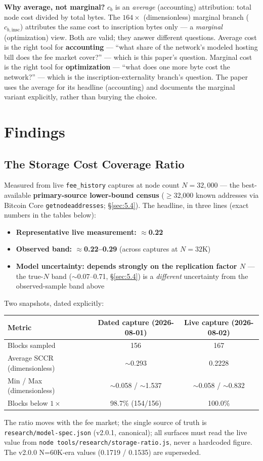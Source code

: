 \documentclass[11pt]{article}
\begin{document}
\textbf{Why average, not marginal?} $c_b$ is an \emph{average} (accounting) attribution: total node cost divided by total bytes. The $164\times$ (dimensionless) marginal branch ($c_{b,\mathrm{insc}}$) attributes the same cost to inscription bytes only --- a \emph{marginal} (optimization) view. Both are valid; they answer different questions. Average cost is the right tool for \textbf{accounting} --- ``what share of the network's modeled hosting bill does the fee market cover?'' --- which is this paper's question. Marginal cost is the right tool for \textbf{optimization} --- ``what does one more byte cost the network?'' --- which is the inscription-externality branch's question. The paper uses the average for its headline (accounting) and documents the marginal variant explicitly, rather than burying the choice.

\section{Findings}\label{sec:5}
\subsection{The Storage Cost Coverage Ratio}\label{sec:5.1}
Measured from live \texttt{fee\_history} captures at node count $N=32{,}000$ --- the best-available \textbf{primary-source lower-bound census} ($\geq$32{,}000 known addresses via Bitcoin Core \texttt{getnodeaddresses}; \S\ref{sec:5.4}). The headline, in three lines (exact numbers in the tables below):

\begin{itemize}
\item \textbf{Representative live measurement: $\approx$0.22}
\item \textbf{Observed band: $\approx$0.22--0.29} (across captures at $N=32$K)
\item \textbf{Model uncertainty: depends strongly on the replication factor $N$} --- the true-$N$ band ($\sim$0.07--0.71, \S\ref{sec:5.4}) is a \emph{different} uncertainty from the observed-sample band above
\end{itemize}

Two snapshots, dated explicitly:
\begin{center}
\renewcommand{\arraystretch}{1.25}
\begin{tabular}{lcc}
\toprule
Metric & Dated capture (2026-08-01) & Live capture (2026-08-02) \\
\midrule
Blocks sampled & 156 & 167 \\
Average SCCR (dimensionless) & $\sim$0.293 & 0.2228 \\
Min / Max (dimensionless) & $\sim$0.058 / $\sim$1.537 & $\sim$0.058 / $\sim$0.832 \\
Blocks below $1\times$ & 98.7\% (154/156) & 100.0\% \\
\bottomrule
\end{tabular}
\end{center}
The ratio moves with the fee market; the single source of truth is \texttt{research/model-spec.json} (v2.0.1, canonical); all surfaces must read the live value from \texttt{node tools/research/storage-ratio.js}, never a hardcoded figure. The v2.0.0 N=60K-era values (0.1719 / 0.1535) are superseded.
\end{document}
